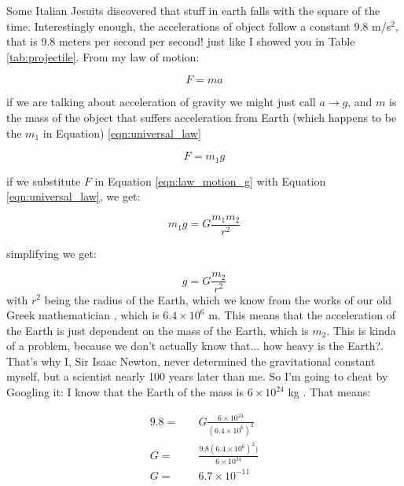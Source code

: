 \documentclass[preprint,12pt]{elsarticle}
\begin{document}
Some Italian Jesuits \cite{zubov2008physical,riccioliastronomiae} discovered that stuff in earth falls with the square of the time. Interestingly enough, the accelerations of object follow a constant 9.8 m/s$^2$, that is 9.8 meters per second per second! just like I showed you in Table \ref{tab:projectile}. From my law of motion:

\begin{equation}
F = m a
\end{equation}

\noindent
if we are talking about acceleration of gravity we might just call $a\rightarrow g$, and $m$ is the mass of the object that suffers acceleration from Earth (which happens to be the $m_1$ in Equation) \ref{eqn:universal_law}

\begin{equation}\label{eqn:law_motion_g}
F = m_1 g 
\end{equation}

\noindent
if we substitute $F$ in Equation \ref{eqn:law_motion_g} with Equation \ref{eqn:universal_law}, we get:

\begin{equation}
m_1 g = G\frac{m_1 m_2}{r^2}
\end{equation}

\noindent
simplifying we get:

\begin{equation}
    g = G \frac{m_2}{r^2}
\end{equation}
\noindent
with $r^2$ being the radius of the Earth, which we know from the works of our old Greek mathematician \cite{roller2010eratosthenes}, which is $6.4\times10^6$ m. This means that the acceleration of the Earth is just dependent on the mass of the Earth, which is $m_2$. This is kinda of a problem, because we don't actually know that... how heavy is the Earth?. That's why I, Sir Isaac Newton, never determined the gravitational constant myself, but a scientist nearly 100 years later than me. So I'm going to cheat by Googling it: I know that the Earth of the mass is $6\times 10^24$ kg \cite{clotfelter1987cavendish}. That means:

\begin{align} %
    9.8 =\quad & G \frac{6\times 10^{24}}{(6.4\times10^6)^2} \\
    G =\quad & \frac{9.8(6.4\times10^6)^2)}{6\times 10^{24}}\\
    G =\quad & 6.7\times10^{-11}
\end{align} %
\end{document}
